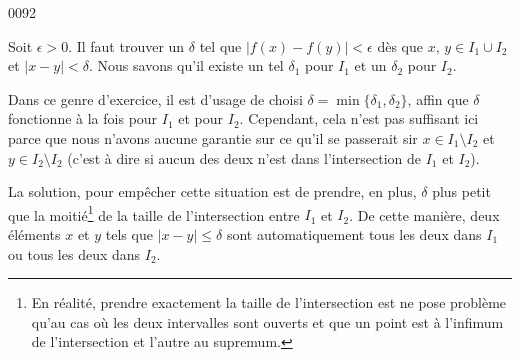 
\begin{corrige}{0092}

Soit $\epsilon>0$. Il faut trouver un $\delta$ tel que $| f(x)-f(y) |<\epsilon$ dès que $x$, $y\in I_1\cup I_2$ et $| x-y |<\delta$. Nous savons qu'il existe un tel $\delta_1$ pour $I_1$ et un $\delta_2$ pour $I_2$.

Dans ce genre d'exercice, il est d'usage de choisi $\delta=\min\{ \delta_1,\delta_2 \}$, affin que $\delta$ fonctionne à la fois pour $I_1$ et pour $I_2$. Cependant, cela n'est pas suffisant ici parce que nous n'avons aucune garantie sur ce qu'il se passerait sir $x\in I_1\setminus I_2$ et $y\in I_2\setminus I_2$ (c'est à dire si aucun des deux n'est dans l'intersection de $I_1$ et $I_2$).

La solution, pour empêcher cette situation est de prendre, en plus, $\delta$ plus petit que la moitié\footnote{En réalité, prendre exactement la taille de l'intersection est ne pose problème qu'au cas où les deux intervalles sont ouverts et que un point est à l'infimum de l'intersection et l'autre au supremum.} de la taille de l'intersection entre $I_1$ et $I_2$. De cette manière, deux éléments $x$ et $y$ tels que $| x-y |\leq\delta$ sont automatiquement tous les deux dans $I_1$ ou tous les deux dans $I_2$.

\end{corrige}
